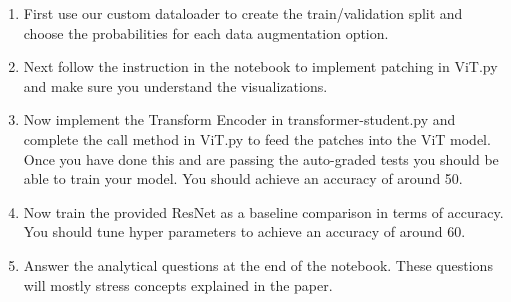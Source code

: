 \documentclass{article}
\begin{document}
\begin{enumerate}[label=(\alph*)]
\color{black}
\item First use our custom dataloader to create the train/validation split and choose the probabilities for each data augmentation option.
\item Next follow the instruction in the notebook to implement patching in ViT.py and make sure you understand the visualizations.
\item Now implement the Transform Encoder in transformer-student.py and complete the call method in ViT.py to feed the patches into the ViT model. Once you have done this and are passing the auto-graded
tests you should be able to train your model. You should achieve an accuracy of around 50.
\item Now train the provided ResNet as a baseline comparison in terms of accuracy. You should tune hyper parameters to achieve an accuracy of around 60.
\item Answer the analytical questions at the end of the notebook. These questions will mostly stress concepts explained in the paper.
\end{enumerate}
\bigbreak

\color{black}
\end{document}
